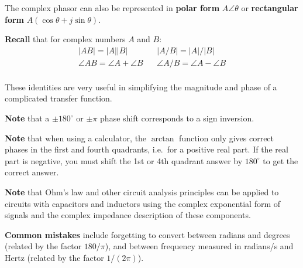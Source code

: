 \documentclass[11pt]{report}
\begin{document}
The complex phasor can also be represented in \textbf{polar form} $A\angle
\theta$ or \textbf{rectangular form} $A(\cos\theta + j \sin\theta)$.

\textbf{Recall} that for complex numbers $A$ and $B$:
\begin{equation}
\begin{split}
|AB| = |A||B|~~&~~|A/B| = |A|/|B|\\
\angle AB = \angle A + \angle B~~&~~\angle A/B = \angle A - \angle B\\
\end{split}
\end{equation}

These identities are very useful in simplifying the magnitude and
phase of a complicated transfer function.

\textbf{Note} that a $\pm 180^\circ$ or $\pm \pi$ phase shift
corresponds to a sign inversion.

\textbf{Note} that when using a calculator, the $\arctan$ function
only gives correct phases in the first and fourth quadrants, i.e.\ for 
a positive real part.  If the real part is negative, you must
shift the 1st or 4th quadrant answer by $180^\circ$ to get the correct
answer.

\textbf{Note} that Ohm's law and other circuit analysis principles can be applied to circuits with capacitors and
inductors using the complex exponential form of signals and the
complex impedance description of these components.

\textbf{Common mistakes} include forgetting to convert between radians and
degrees (related by the factor $180/\pi$), and between frequency
measured in radians/s and Hertz (related by the factor $1/(2 \pi)$).

\clearpage
\end{document}
